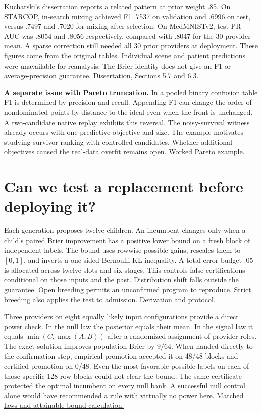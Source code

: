 \documentclass[10pt,a4paper]{article}
\newcommand{\FB}[2]{\href{https://github.com/damiankucharski/fusionbench/blob/5f9254e0c6e4559d7c0d19f28dc91641fba09d57/docs/ensemble-study/#1}{#2}}
\begin{document}
Kucharski's dissertation reports a related pattern at prior weight .85. On STARCOP, in-search mixing achieved F1 .7537 on validation and .6996 on test, versus .7497 and .7020 for mixing after selection. On MedMNISTv2, test PR-AUC was .8054 and .8056 respectively, compared with .8047 for the 30-provider mean. A sparse correction still needed all 30 prior providers at deployment. These figures come from the original tables. Individual scene and patient predictions were unavailable for reanalysis. The Brier identity does not give an F1 or average-precision guarantee. \href{https://bip.polsl.pl/wp-content/uploads/sites/4/2026/11/Damian-Kucharski_rozprawa-doktorska.pdf\#page=124}{Dissertation, Sections 5.7 and 6.3.}

\textbf{A separate issue with Pareto truncation.}
In a pooled binary confusion table F1 is determined by precision and recall. Appending F1 can change the order of nondominated points by distance to the ideal even when the front is unchanged. A two-candidate native replay exhibits this reversal. The noisy-survival witness already occurs with one predictive objective and size. The example motivates studying survivor ranking with controlled candidates. Whether additional objectives caused the real-data overfit remains open. \FB{anchoring-geometry/replacement-and-pareto.md}{Worked Pareto example.}

\section{Can we test a replacement before deploying it?}
Each generation proposes twelve children. An incumbent changes only when a child's paired Brier improvement has a positive lower bound on a fresh block of independent labels. The bound uses rowwise possible gains, rescales them to $[0,1]$, and inverts a one-sided Bernoulli KL inequality. A total error budget .05 is allocated across twelve slots and six stages. This controls false certifications conditional on those inputs and the past. Distribution shift falls outside the guarantee. Open breeding permits an unconfirmed program to reproduce. Strict breeding also applies the test to admission. \FB{replacement-experiment/protocol.md}{Derivation and protocol.}

Three providers on eight equally likely input configurations provide a direct power check. In the null law the posterior equals their mean. In the signal law it equals $\min(C,\max(A,B))$ after a randomized assignment of provider roles. The exact solution improves population Brier by $9/64$. When handed directly to the confirmation step, empirical promotion accepted it on 48/48 blocks and certified promotion on 0/48. Even the most favorable possible labels on each of those specific 128-row blocks could not clear the bound. The same certificate protected the optimal incumbent on every null bank. A successful null control alone would have recommended a rule with virtually no power here. \FB{replacement-experiment/controlled/README.md}{Matched laws and attainable-bound calculation.}
\end{document}
